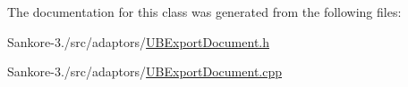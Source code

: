 The documentation for this class was generated from the following files\-:\begin{DoxyCompactItemize}
\item 
Sankore-\/3./src/adaptors/\hyperlink{_u_b_export_document_8h}{U\-B\-Export\-Document.\-h}\item 
Sankore-\/3./src/adaptors/\hyperlink{_u_b_export_document_8cpp}{U\-B\-Export\-Document.\-cpp}\end{DoxyCompactItemize}
